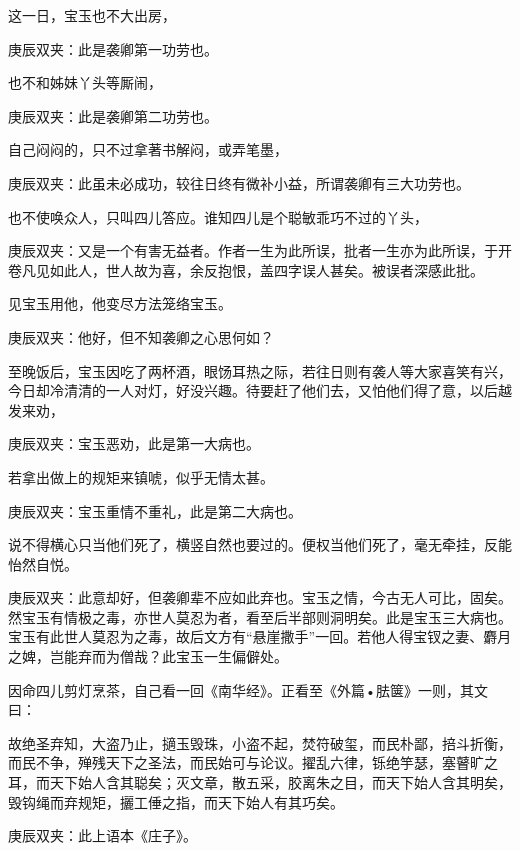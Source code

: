 \begin{parag}
    这一日，宝玉也不大出房，\begin{note}庚辰双夹：此是袭卿第一功劳也。\end{note}也不和姊妹丫头等厮闹，\begin{note}庚辰双夹：此是袭卿第二功劳也。\end{note}自己闷闷的，只不过拿著书解闷，或弄笔墨，\begin{note}庚辰双夹：此虽未必成功，较往日终有微补小益，所谓袭卿有三大功劳也。\end{note}也不使唤众人，只叫四儿答应。谁知四儿是个聪敏乖巧不过的丫头，\begin{note}庚辰双夹：又是一个有害无益者。作者一生为此所误，批者一生亦为此所误，于开卷凡见如此人，世人故为喜，余反抱恨，盖四字误人甚矣。被误者深感此批。\end{note}见宝玉用他，他变尽方法笼络宝玉。\begin{note}庚辰双夹：他好，但不知袭卿之心思何如？\end{note}至晚饭后，宝玉因吃了两杯酒，眼饧耳热之际，若往日则有袭人等大家喜笑有兴，今日却冷清清的一人对灯，好没兴趣。待要赶了他们去，又怕他们得了意，以后越发来劝，\begin{note}庚辰双夹：宝玉恶劝，此是第一大病也。\end{note}若拿出做上的规矩来镇唬，似乎无情太甚。\begin{note}庚辰双夹：宝玉重情不重礼，此是第二大病也。\end{note}说不得横心只当他们死了，横竖自然也要过的。便权当他们死了，毫无牵挂，反能怡然自悦。\begin{note}庚辰双夹：此意却好，但袭卿辈不应如此弃也。宝玉之情，今古无人可比，固矣。然宝玉有情极之毒，亦世人莫忍为者，看至后半部则洞明矣。此是宝玉三大病也。宝玉有此世人莫忍为之毒，故后文方有“悬崖撒手”一回。若他人得宝钗之妻、麝月之婢，岂能弃而为僧哉？此宝玉一生偏僻处。\end{note}因命四儿剪灯烹茶，自己看一回《南华经》。正看至《外篇•胠箧》一则，其文曰：
\end{parag}


\begin{qute2sp}

    故绝圣弃知，大盗乃止，擿玉毁珠，小盗不起，焚符破玺，而民朴鄙，掊斗折衡，而民不争，殚残天下之圣法，而民始可与论议。擢乱六律，铄绝竽瑟，塞瞽旷之耳，而天下始人含其聪矣；灭文章，散五采，胶离朱之目，而天下始人含其明矣，毁钩绳而弃规矩，攦工倕之指，而天下始人有其巧矣。\begin{note}庚辰双夹：此上语本《庄子》。\end{note}
\end{qute2sp}


